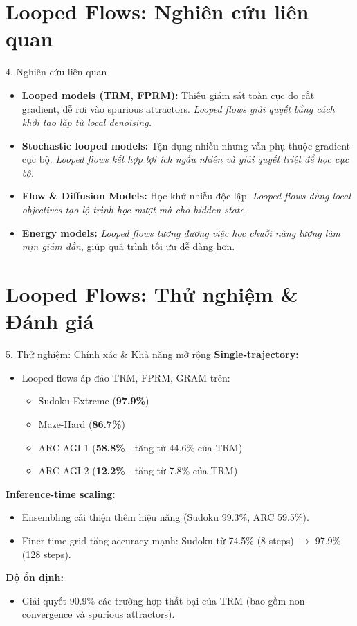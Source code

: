 \section{Looped Flows: Nghiên cứu liên quan}
\begin{frame}{4. Nghiên cứu liên quan}
    \begin{itemize}
        \item \textbf{Looped models (TRM, FPRM):} Thiếu giám sát toàn cục do cắt gradient, dễ rơi vào spurious attractors. \textit{Looped flows giải quyết bằng cách khởi tạo lặp từ local denoising.}
        \item \textbf{Stochastic looped models:} Tận dụng nhiễu nhưng vẫn phụ thuộc gradient cục bộ. \textit{Looped flows kết hợp lợi ích ngẫu nhiên và giải quyết triệt để học cục bộ.}
        \item \textbf{Flow \& Diffusion Models:} Học khử nhiễu độc lập. \textit{Looped flows dùng local objectives tạo lộ trình học mượt mà cho hidden state.}
        \item \textbf{Energy models:} \textit{Looped flows tương đương việc học chuỗi năng lượng làm mịn giảm dần}, giúp quá trình tối ưu dễ dàng hơn.
    \end{itemize}
\end{frame}

\section{Looped Flows: Thử nghiệm \& Đánh giá}
\begin{frame}{5. Thử nghiệm: Chính xác \& Khả năng mở rộng}
    \textbf{Single-trajectory:}
    \begin{itemize}
        \item Looped flows áp đảo TRM, FPRM, GRAM trên:
        \begin{itemize}
            \item Sudoku-Extreme (\textbf{97.9\%})
            \item Maze-Hard (\textbf{86.7\%})
            \item ARC-AGI-1 (\textbf{58.8\%} - tăng từ 44.6\% của TRM)
            \item ARC-AGI-2 (\textbf{12.2\%} - tăng từ 7.8\% của TRM)
        \end{itemize}
    \end{itemize}
    \textbf{Inference-time scaling:}
    \begin{itemize}
        \item Ensembling cải thiện thêm hiệu năng (Sudoku 99.3\%, ARC 59.5\%).
        \item Finer time grid tăng accuracy mạnh: Sudoku từ 74.5\% (8 steps) $\rightarrow$ 97.9\% (128 steps).
    \end{itemize}
    \textbf{Độ ổn định:}
    \begin{itemize}
        \item Giải quyết 90.9\% các trường hợp thất bại của TRM (bao gồm non-convergence và spurious attractors).
    \end{itemize}
\end{frame}

